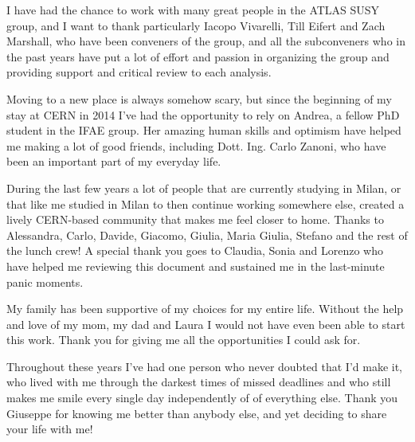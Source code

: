 \par\medskip
I have had the chance to work with many great people in the ATLAS SUSY group, and 
I want to thank particularly Iacopo Vivarelli, Till Eifert and Zach Marshall, who have been conveners of the group,
and all the subconveners who in the past years 
have put a lot of effort and passion in organizing the group and providing support and critical review 
to each analysis. 

\par\medskip 
Moving to a new place is always somehow scary, but since the beginning of my 
stay at CERN in 2014 I've had the opportunity to rely on Andrea, a fellow PhD student in the 
IFAE group. 
Her amazing human skills and optimism have helped me making a lot of good friends, including Dott. Ing. 
Carlo Zanoni, who have been an important part of my everyday life. 

\par\medskip

During the last few years a lot of people that are currently studying in Milan, or that like me 
studied in Milan to then continue working somewhere else, created a lively CERN-based community that 
makes me feel closer to home. 
Thanks to Alessandra, Carlo, Davide, Giacomo, Giulia, Maria Giulia, Stefano and the rest of the 
lunch crew! A special thank you goes to Claudia, Sonia and Lorenzo who have helped me reviewing this document and 
sustained me in the last-minute panic moments. 

\par\medskip 
My family has been supportive of my choices for my entire life. 
Without the help and love of my mom, my dad and Laura I would not have even been able to start this work. 
Thank you for giving me all the opportunities I could ask for. 

\par\medskip 
Throughout these years I've had one person who never doubted that I'd make it, 
who lived with me through the darkest times of missed deadlines 
and who still makes me smile every single day independently 
of of everything else. 
Thank you Giuseppe for knowing me better than anybody else, 
and yet deciding to share your life with me! 


